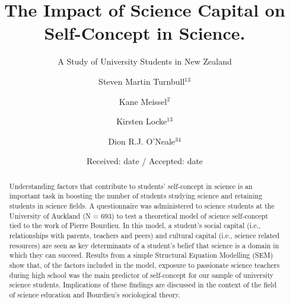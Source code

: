 \documentclass[smallextended]{svjour3}       %
\begin{document}
\title{The Impact of Science Capital on Self-Concept in Science.}



\subtitle{A Study of University Students in New Zealand}


\author{Steven Martin Turnbull$^{13}$       \and
       Kane Meissel$^2$\and
       Kirsten Locke$^{13}$\and
       Dion R.J. O'Neale$^{34}$
}





\date{Received: date / Accepted: date}


\maketitle

\begin{abstract}
Understanding factors that contribute to students' self-concept in science is an important task in boosting the number of students studying science and retaining students in science fields. A questionnaire was administered to science students at the University of Auckland (N = 693) to test a theoretical model of science self-concept tied to the work of Pierre Bourdieu. In this model, a student's social capital (i.e., relationships with parents, teachers and peers) and cultural capital (i.e., science related resources) are seen as key determinants of a student's belief that science is a domain in which they can succeed. Results from a simple Structural Equation Modelling (SEM) show that, of the factors included in the model, exposure to passionate science teachers during high school was the main predictor of self-concept for our sample of university science students. Implications of these findings are discussed in the context of the field of science education and Bourdieu's sociological theory.
\end{abstract}
\end{document}
